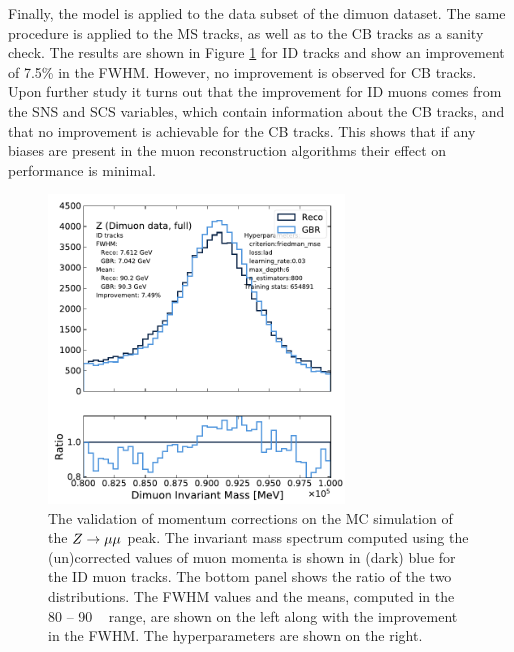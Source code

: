Finally, the model is applied to the data subset of the dimuon dataset.
The same procedure is applied to the MS tracks, as well as to the CB
tracks as a sanity check. The results are shown in Figure
\ref{fig:muon:vader-dimuon} for ID tracks and show an improvement
of 7.5\% in the FWHM. However, no improvement is observed for CB tracks.
Upon further study it turns out that the improvement for ID muons comes
from the SNS and SCS variables, which contain information about the CB
tracks, and that no improvement is achievable
for the CB tracks. This shows that if any biases are present in
the muon reconstruction algorithms their effect on performance is minimal.
\begin{figure}[h!]
  \centering
  \includegraphics[width=0.7\textwidth]{figures/muons/vader-dimuon-ID}
  \caption[VADER4$\mu$ correction on the dimuon dataset]
  {The validation of momentum corrections on the MC simulation of the $Z \rightarrow \mu\mu$
  peak. The invariant mass spectrum computed using the (un)corrected values
  of muon momenta is shown in (dark) blue for the ID muon tracks. The bottom
  panel shows the ratio of the two distributions. The FWHM values and the means,
  computed in the 80 -- 90 \GeV~ range,
  are shown on the left along with the improvement in the FWHM.
  The hyperparameters are shown on the right.}
  \label{fig:muon:vader-dimuon}
\end{figure}

